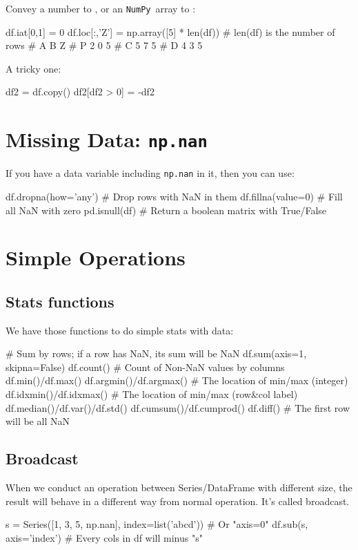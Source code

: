 \documentclass{report}
\newcommand{\pkg}[1]{\texttt{#1}}
\newcommand{\NumPy}{\pkg{NumPy}}
\begin{document}
Convey a number to , or an \NumPy\ array to : 
\begin{py}
df.iat[0,1] = 0
df.loc[:,'Z'] = np.array([5] * len(df)) # len(df) is the number of rows
#    A  B  Z
# P  2  0  5
# C  5  7  5
# D  4  3  5
\end{py}

A tricky one:
\begin{py}
df2 = df.copy()
df2[df2 > 0] = -df2
\end{py}

\section{Missing Data: \pkg{np.nan}}
If you have a data variable including \pkg{np.nan} in it, then you can use:
\begin{py}
df.dropna(how='any')  # Drop rows with NaN in them
df.fillna(value=0)  # Fill all NaN with zero
pd.isnull(df)  # Return a boolean matrix with True/False 
\end{py}

\section{Simple Operations}
\subsection{Stats functions}
We have those functions to do simple stats with data:
\begin{py}
# Sum by rows; if a row has NaN, its sum will be NaN
df.sum(axis=1, skipna=False)
df.count()  # Count of Non-NaN values by columns
df.min()/df.max()
df.argmin()/df.argmax()  # The location of min/max (integer)
df.idxmin()/df.idxmax()  # The location of min/max (row&col label)
df.median()/df.var()/df.std()
df.cumsum()/df.cumprod()
df.diff()  # The first row will be all NaN
\end{py}

\subsection{Broadcast}
When we conduct an operation between Series/DataFrame with different size, the result will behave in a different way from normal operation. It's called broadcast.  
\begin{py}
s = Series([1, 3, 5, np.nan], index=list('abcd'))
# Or "axis=0"
df.sub(s, axis='index')  # Every cols in df will minus "s"
\end{py}
\end{document}
